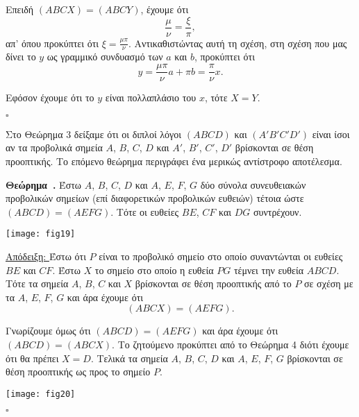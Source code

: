 \documentclass[12pt, a4paper]{book}
\newcounter{theorem}[section]
\newenvironment{theorem}[1][]{\refstepcounter{theorem}\par\medskip
   \textbf{Θεώρημα~\thetheorem. #1} \rmfamily}{\medskip}
\begin{document}
Επειδή $(ABCX)=(ABCY)$, έχουμε ότι
\begin{displaymath}
\frac{μ}{ν}=\frac{ξ}{π},
\end{displaymath}
απ' όπου προκύπτει ότι $ξ = \frac{μπ}{ν}$. Αντικαθιστώντας αυτή τη σχέση, στη σχέση που μας δίνει το $y$ ως γραμμικό συνδυασμό των $a$ και $b$, προκύπτει ότι
\begin{displaymath}
y=\frac{μπ}{ν}a+πb=\frac{π}{ν}x.
\end{displaymath}

Εφόσον έχουμε ότι το $y$ είναι πολλαπλάσιο του $x$, τότε $X=Y$.
  \begin{flushright}
  $\square$
  \end{flushright}
  
Στο Θεώρημα 3 δείξαμε ότι οι διπλοί λόγοι $(ABCD)$ και $(A'B'C'D')$ είναι ίσοι αν τα προβολικά σημεία $A$, $B$, $C$, $D$ και $A'$, $B'$, $C'$, $D'$ βρίσκονται σε θέση προοπτικής. Το επόμενο θεώρημα περιγράφει ένα μερικώς αντίστροφο αποτέλεσμα.

\begin{theorem}
Έστω $A$, $B$, $C$, $D$ και $A$, $E$, $F$, $G$ δύο σύνολα συνευθειακών προβολικών σημείων (επί διαφορετικών προβολικών ευθειών) τέτοια ώστε $(ABCD)=(AEFG)$. Τότε οι ευθείες $BE$, $CF$ και $DG$ συντρέχουν.
\end{theorem}

\begin{center}
\texttt{[image: fig19]}
\end{center}

\underline{Απόδειξη: } Έστω ότι $P$ είναι το προβολικό σημείο στο οποίο συναντώνται οι ευθείες $BE$ και $CF$. Έστω $X$ το σημείο στο οποίο η ευθεία $PG$ τέμνει την ευθεία $ABCD$. Τότε τα σημεία $A$, $B$, $C$ και $X$ βρίσκονται σε θέση προοπτικής από το $P$ σε σχέση με τα $A$, $E$, $F$, $G$ και άρα έχουμε ότι
\begin{displaymath}
(ABCX)=(AEFG).
\end{displaymath}

Γνωρίζουμε όμως ότι $(ABCD)=(AEFG)$ και άρα έχουμε ότι $(ABCD)=(ABCX)$. Το ζητούμενο προκύπτει από το Θεώρημα 4 διότι έχουμε ότι θα πρέπει $X=D$. Τελικά τα σημεία $A$, $B$, $C$, $D$ και $A$, $E$, $F$, $G$ βρίσκονται σε θέση προοπτικής ως προς το σημείο $P$.
\begin{center}
\texttt{[image: fig20]}
\end{center}
  \begin{flushright}
  $\square$
  \end{flushright}
  
\end{document}
